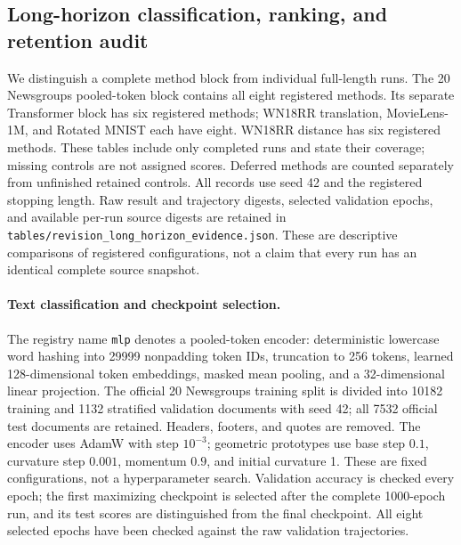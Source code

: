 \subsection{Long-horizon classification, ranking, and retention audit}
\label{app:long-horizon-audit}
We distinguish a complete method block from individual full-length runs. The 20 Newsgroups pooled-token block contains all eight registered methods. Its separate Transformer block has six registered methods; WN18RR translation, MovieLens-1M, and Rotated MNIST each have eight. WN18RR distance has six registered methods. These tables include only completed runs and state their coverage; missing controls are not assigned scores. Deferred methods are counted separately from unfinished retained controls. All records use seed 42 and the registered stopping length. Raw result and trajectory digests, selected validation epochs, and available per-run source digests are retained in \texttt{tables/revision\_long\_horizon\_evidence.json}. These are descriptive comparisons of registered configurations, not a claim that every run has an identical complete source snapshot.

\paragraph{Text classification and checkpoint selection.}
The registry name \texttt{mlp} denotes a pooled-token encoder: deterministic lowercase word hashing into 29999 nonpadding token IDs, truncation to 256 tokens, learned 128-dimensional token embeddings, masked mean pooling, and a 32-dimensional linear projection. The official 20 Newsgroups training split is divided into 10182 training and 1132 stratified validation documents with seed 42; all 7532 official test documents are retained. Headers, footers, and quotes are removed. The encoder uses AdamW with step $10^{-3}$; geometric prototypes use base step $0.1$, curvature step $0.001$, momentum $0.9$, and initial curvature 1. These are fixed configurations, not a hyperparameter search. Validation accuracy is checked every epoch; the first maximizing checkpoint is selected after the complete 1000-epoch run, and its test scores are distinguished from the final checkpoint. All eight selected epochs have been checked against the raw validation trajectories.



